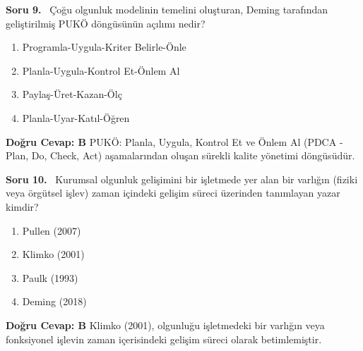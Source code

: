 \documentclass[11pt,a4paper,openany]{book}
\begin{document}
\needspace{5cm}
\vspace{8pt}
\noindent\textbf{\large\sffamily Soru 9.} \ Çoğu olgunluk modelinin temelini oluşturan, Deming tarafından geliştirilmiş PUKÖ döngüsünün açılımı nedir?
\begin{enumerate}[label=\Alph*), leftmargin=25pt, topsep=4pt, itemsep=2pt]
    \item Programla-Uygula-Kriter Belirle-Önle
    \item Planla-Uygula-Kontrol Et-Önlem Al
    \item Paylaş-Üret-Kazan-Ölç
    \item Planla-Uyar-Katıl-Öğren
\end{enumerate}
\vspace{4pt}
\begin{tcolorbox}[title=Cevap ve Açıklama, colback=gray!3!white, colframe=primarycolor!90!black, arc=2mm, fonttitle=\bfseries\sffamily, top=6pt, bottom=6pt]
    \textbf{Doğru Cevap: B}
    \vspace{2pt}
    PUKÖ: Planla, Uygula, Kontrol Et ve Önlem Al (PDCA - Plan, Do, Check, Act) aşamalarından oluşan sürekli kalite yönetimi döngüsüdür.
\end{tcolorbox}
\vspace{10pt}

\needspace{5cm}
\vspace{8pt}
\noindent\textbf{\large\sffamily Soru 10.} \ Kurumsal olgunluk gelişimini bir işletmede yer alan bir varlığın (fiziki veya örgütsel işlev) zaman içindeki gelişim süreci üzerinden tanımlayan yazar kimdir?
\begin{enumerate}[label=\Alph*), leftmargin=25pt, topsep=4pt, itemsep=2pt]
    \item Pullen (2007)
    \item Klimko (2001)
    \item Paulk (1993)
    \item Deming (2018)
\end{enumerate}
\vspace{4pt}
\begin{tcolorbox}[title=Cevap ve Açıklama, colback=gray!3!white, colframe=primarycolor!90!black, arc=2mm, fonttitle=\bfseries\sffamily, top=6pt, bottom=6pt]
    \textbf{Doğru Cevap: B}
    \vspace{2pt}
    Klimko (2001), olgunluğu işletmedeki bir varlığın veya fonksiyonel işlevin zaman içerisindeki gelişim süreci olarak betimlemiştir.
\end{tcolorbox}
\vspace{10pt}
\end{document}
